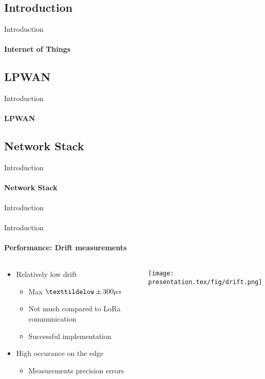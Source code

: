 \subsection{Introduction}

\begin{frame}{Introduction}
\framesubtitle{Internet of Things}

\end{frame}

\subsection{LPWAN}

\begin{frame}{Introduction}
\framesubtitle{LPWAN}

\end{frame}

\subsection{Network Stack}

\begin{frame}{Introduction}
\framesubtitle{Network Stack}

\end{frame}

\begin{frame}{Introduction}
\framesubtitle{}
\end{frame}


\begin{frame}{Introduction}
\framesubtitle{Performance: Drift measurements}

\begin{columns}
\begin{column}{0.5\textwidth}
\begin{itemize}
  \item Relatively low drift
  \begin{itemize}
    \item Max $\texttildelow \pm 300\mu s$
    \item Not much compared to LoRa communication
    \item Successful implementation
  \end{itemize}
  \item High occurance on the edge
  \begin{itemize}
    \item Measurements precision errors
  \end{itemize}
\end{itemize}
\end{column} 
\begin{column}{0.5\textwidth}
\begin{center}
  \texttt{[image: presentation.tex/fig/drift.png]}
\end{center}
\end{column} 
\end{columns}

\end{frame}
